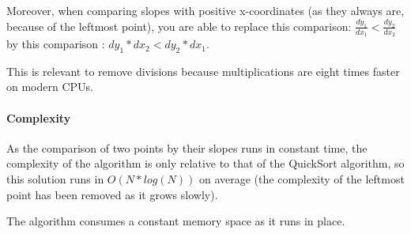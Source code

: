 \documentclass[a4paper]{article}
\begin{document}
    Moreover, when comparing slopes with positive x-coordinates (as they always
are, because of the leftmost point), you are able to replace this comparison:
$\frac{dy_1}{dx_1} < \frac{dy_2}{dx_2}$ by this comparison : 
$dy_1 * dx_2 < dy_2 * dx_1$.

    This is relevant to remove divisions because multiplications are eight times
faster on modern CPUs.

     \paragraph{Complexity} As the comparison of two points by their slopes runs
in constant time, the complexity of the algorithm is only relative to that of
the QuickSort algorithm, so this solution runs in $O(N * log (N))$ on average
(the complexity of the leftmost point has been removed as it grows slowly).

    The algorithm consumes a constant memory space as it runs in place.
\end{document}
